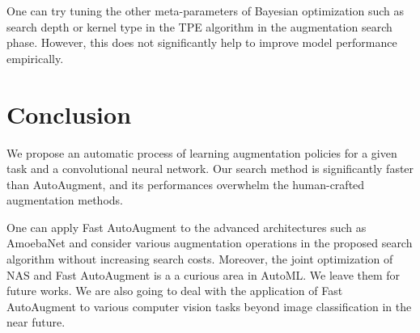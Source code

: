 \documentclass{article}
\begin{document}
One can try tuning the other meta-parameters of Bayesian optimization such as search depth or kernel type in the TPE algorithm in the augmentation search phase. However, this does not significantly help to improve model performance empirically. 

\section{Conclusion}

We propose an automatic process of learning augmentation policies for a given task and a convolutional neural network. Our search method is significantly faster than AutoAugment, and its performances overwhelm the human-crafted augmentation methods. 

One can apply Fast AutoAugment to the advanced architectures such as AmoebaNet and consider various augmentation operations in the proposed search algorithm without increasing search costs. Moreover, the joint optimization of NAS and Fast AutoAugment is a a curious area in AutoML. We leave them for future works. We are also going to deal with the application of Fast AutoAugment to various computer vision tasks beyond image classification in the near future. 



\newpage




\end{document}
